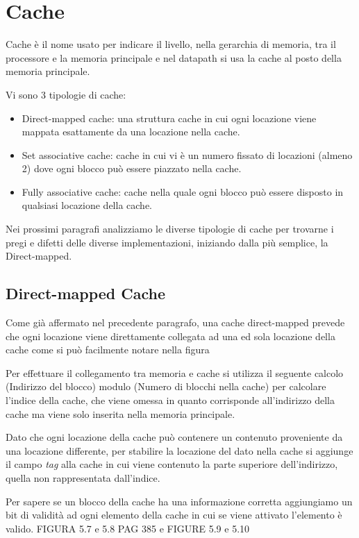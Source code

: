 \section{Cache}
Cache è il nome usato per indicare il livello, nella gerarchia di memoria, tra il
processore e la memoria principale e nel datapath si usa la cache al posto della memoria principale.

Vi sono 3 tipologie di cache:
\begin{itemize}
  \item Direct-mapped cache: una struttura cache in cui ogni locazione viene mappata
        esattamente da una locazione nella cache.
  \item Set associative cache: cache in cui vi è un numero fissato di locazioni (almeno 2)
        dove ogni blocco può essere piazzato nella cache.
  \item Fully associative cache: cache nella quale ogni blocco può essere disposto
        in qualsiasi locazione della cache.
\end{itemize}
Nei prossimi paragrafi analizziamo le diverse tipologie di cache per trovarne i
pregi e difetti delle diverse implementazioni, iniziando dalla più semplice, la Direct-mapped.

\subsection{Direct-mapped Cache}
Come già affermato nel precedente paragrafo, una cache direct-mapped prevede che ogni
locazione viene direttamente collegata ad una ed sola locazione della cache come si
può facilmente notare nella figura

Per effettuare il collegamento tra memoria e cache si utilizza il seguente calcolo
(Indirizzo del blocco) modulo (Numero di blocchi nella cache) per calcolare l'indice della cache,
che viene omessa in quanto corrisponde all'indirizzo della cache ma viene solo inserita
nella memoria principale.

Dato che ogni locazione della cache può contenere un contenuto proveniente da una locazione
differente, per stabilire la locazione del dato nella cache si aggiunge il campo \emph{tag}
alla cache in cui viene contenuto la parte superiore dell'indirizzo, quella non rappresentata
dall'indice.

Per sapere se un blocco della cache ha una informazione corretta aggiungiamo un bit
di validità ad ogni elemento della cache in cui se viene attivato l'elemento è valido.
FIGURA 5.7 e 5.8 PAG 385 e FIGURE 5.9 e 5.10


